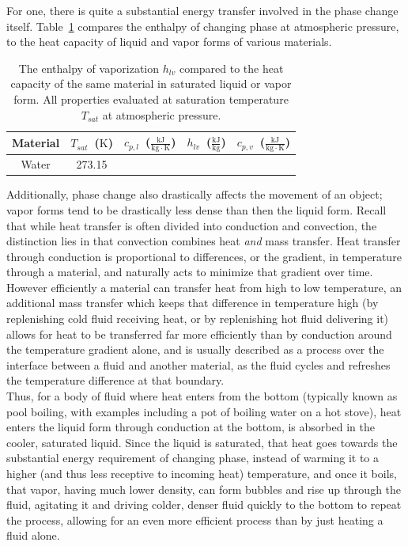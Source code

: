 \documentclass[12pt]{article}
\begin{document}
For one, there is quite a substantial energy transfer involved in the phase change itself.
Table~\ref{tab:phase_props} compares the enthalpy of changing phase at atmospheric pressure, to the heat capacity of liquid and vapor forms of various materials.
\begin{table}
    \centering
    \caption{The enthalpy of vaporization $h_{lv}$ compared to the heat capacity of the same material in saturated liquid or vapor form. All properties evaluated at saturation temperature $T_{sat}$ at atmospheric pressure.}
    \label{tab:phase_props}
    \begin{tabular}{c|c|ccc}
        \hline
        Material & $T_{sat}$~($\mathrm{K}$) & $c_{p,l}$~($\mathrm{\frac{kJ}{kg\cdot K}}$) & $h_{lv}$~($\mathrm{\frac{kJ}{kg}}$) & $c_{p,v}$~($\mathrm{\frac{kJ}{kg\cdot K}}$)\\
        \midrule
        Water & 273.15 & &&\\
        \hline
    \end{tabular}
\end{table}

Additionally, phase change also drastically affects the movement of an object; vapor forms tend to be drastically less dense than then the liquid form.
Recall that while heat transfer is often divided into conduction and convection, the distinction lies in that convection combines heat \emph{and} mass transfer.
Heat transfer through conduction is proportional to differences, or the gradient, in temperature through a material, and naturally acts to minimize that gradient over time.
However efficiently a material can transfer heat from high to low temperature, an additional mass transfer which keeps that difference in temperature high (by replenishing cold fluid receiving heat, or by replenishing hot fluid delivering it) allows for heat to be transferred far more efficiently than by conduction around the temperature gradient alone, and is usually described as a process over the interface between a fluid and another material, as the fluid cycles and refreshes the temperature difference at that boundary.\\

Thus, for a body of fluid where heat enters from the bottom (typically known as pool boiling, with examples including a pot of boiling water on a hot stove), heat enters the liquid form through conduction at the bottom, is absorbed in the cooler, saturated liquid.
Since the liquid is saturated, that heat goes towards the substantial energy requirement of changing phase, instead of warming it to a higher (and thus less receptive to incoming heat) temperature, and once it boils, that vapor, having much lower density, can form bubbles and rise up through the fluid, agitating it and driving colder, denser fluid quickly to the bottom to repeat the process, allowing for an even more efficient process than by just heating a fluid alone.\\
\end{document}

